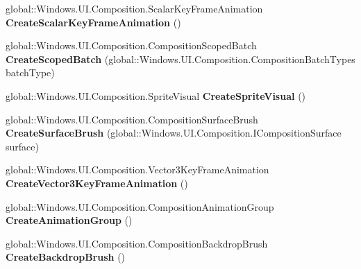 \begin{DoxyCompactItemize}
\item 
\mbox{\label{class_windows_1_1_u_i_1_1_composition_1_1_compositor_a1c091ff2583caeef8359702f57a8ee0d}} 
global\+::\+Windows.\+U\+I.\+Composition.\+Scalar\+Key\+Frame\+Animation {\bfseries Create\+Scalar\+Key\+Frame\+Animation} ()
\item 
\mbox{\label{class_windows_1_1_u_i_1_1_composition_1_1_compositor_a7ffb728cfd21a486270b346127894097}} 
global\+::\+Windows.\+U\+I.\+Composition.\+Composition\+Scoped\+Batch {\bfseries Create\+Scoped\+Batch} (global\+::\+Windows.\+U\+I.\+Composition.\+Composition\+Batch\+Types batch\+Type)
\item 
\mbox{\label{class_windows_1_1_u_i_1_1_composition_1_1_compositor_a74d76a5f9c181cabe102c81e114500ca}} 
global\+::\+Windows.\+U\+I.\+Composition.\+Sprite\+Visual {\bfseries Create\+Sprite\+Visual} ()
\item 
\mbox{\label{class_windows_1_1_u_i_1_1_composition_1_1_compositor_a281e5812822cbd2bb26434f086f15fc2}} 
global\+::\+Windows.\+U\+I.\+Composition.\+Composition\+Surface\+Brush {\bfseries Create\+Surface\+Brush} (global\+::\+Windows.\+U\+I.\+Composition.\+I\+Composition\+Surface surface)
\item 
\mbox{\label{class_windows_1_1_u_i_1_1_composition_1_1_compositor_af205bcd47f5aca9d484b62336a89d804}} 
global\+::\+Windows.\+U\+I.\+Composition.\+Vector3\+Key\+Frame\+Animation {\bfseries Create\+Vector3\+Key\+Frame\+Animation} ()
\item 
\mbox{\label{class_windows_1_1_u_i_1_1_composition_1_1_compositor_a80a2b13bdd26b7fead234728f4e048a4}} 
global\+::\+Windows.\+U\+I.\+Composition.\+Composition\+Animation\+Group {\bfseries Create\+Animation\+Group} ()
\item 
\mbox{\label{class_windows_1_1_u_i_1_1_composition_1_1_compositor_a718536eab5dc7541088008ef9798ad19}} 
global\+::\+Windows.\+U\+I.\+Composition.\+Composition\+Backdrop\+Brush {\bfseries Create\+Backdrop\+Brush} ()

\end{DoxyCompactItemize}
